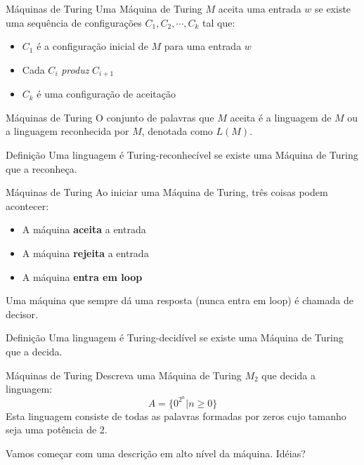 \documentclass{beamer}
\begin{document}
\begin{frame}{Máquinas de Turing}
	Uma Máquina de Turing $M$ \alert{aceita} uma entrada $w$ se existe uma sequência de configurações $C_{1}, C_{2}, \cdots, C_{k}$ tal que:
	\begin{itemize}
		\item $C_{1}$ é a configuração inicial de $M$ para uma entrada $w$
		\item  Cada $C_{i}$ \textit{produz} $C_{i+1}$
		\item $C_{k}$ é uma configuração de aceitação
	\end{itemize}
\end{frame}
\begin{frame}{Máquinas de Turing}
	O conjunto de palavras que $M$ aceita é \alert{a linguagem de $M$} ou \alert{a linguagem reconhecida por $M$}, denotada como $L(M)$.
	\pause
	\begin{block}{Definição}
		Uma linguagem é \alert{Turing-reconhecível} se existe uma Máquina de Turing que a reconheça.
	\end{block}
\end{frame}
\begin{frame}{Máquinas de Turing}
	Ao iniciar uma Máquina de Turing, três coisas podem acontecer:
	\begin{itemize}
		\item A máquina \textbf{aceita} a entrada
		\item A máquina \textbf{rejeita} a entrada
		\item A máquina \textbf{entra em loop}
	\end{itemize}
	Uma máquina que sempre dá uma resposta (nunca entra em loop) é chamada de \alert{decisor}.
	\pause
	\begin{block}{Definição}
		Uma linguagem é \alert{Turing-decidível} se existe uma Máquina de Turing que a decida.
	\end{block}
\end{frame}
\begin{frame}{Máquinas de Turing}
	Descreva uma Máquina de Turing $M_{2}$ que decida a linguagem:
	\begin{equation*}
		A = \{0^{2^{n}} | n \ge 0\}
	\end{equation*}
	\pause
	Esta linguagem consiste de todas as palavras formadas por zeros cujo tamanho seja uma potência de 2.
	
	Vamos começar com uma descrição em alto nível da máquina. Idéias?
\end{frame}
\end{document}
